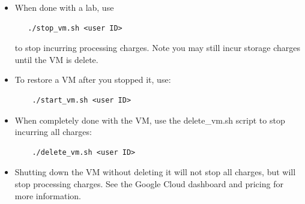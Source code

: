 \documentclass[12pt]{article}
\begin{document}
\begin{itemize}
\item When done with a lab, use
\begin{verbatim}
   ./stop_vm.sh <user ID> 
\end{verbatim}
to stop incurring processing charges.  Note you may still incur storage charges until the VM is delete.

\item To restore a VM after you stopped it, use:
\begin{verbatim}
    ./start_vm.sh <user ID>
\end{verbatim}

\item When completely done with the VM, use the delete\_vm.sh script to stop incurring all charges:
\begin{verbatim}
    ./delete_vm.sh <user ID>
\end{verbatim}

\item Shutting down the VM without deleting it will not stop all charges, but will stop processing charges.
See the Google Cloud dashboard and pricing for more information.
\end{itemize}
\end{document}
